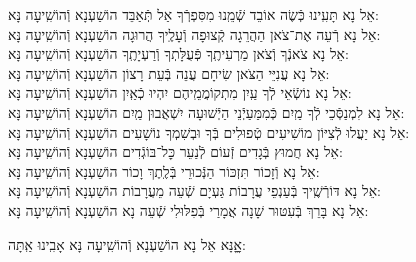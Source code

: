 \documentclass[twoside, openany, parskip=half, 11pt]{book}
\begin{document}
\begin{small}
אֵל נָא תָּעִֽינוּ כְּֿשֶׂה אוֹבֵד שְֿׁמֵֽנוּ מִסִּפְרְֿךָ אַל תְּֿאַבֵּד \hfill הוֹשַׁעְנָא וְֿהוֹשִֽׁיעָה נָּא: \\
אֵל נָא רְֿעֵה אֶת־צֹאן הַהֲרֵגָה קְֿצוּפָה וְֿעָלֶֽיךָ הֲרוּגָה \hfill הוֹשַׁעְנָא וְֿהוֹשִֽׁיעָה נָּא:\\
אֵל נָא צֹאנְֿךָ וְֿצֹאן מַרְעִיתֶֽךָ פְּֿעֻלָּתְךָ וְֿרַעְיָתֶֽךָ \hfill הוֹשַׁעְנָא וְֿהוֹשִֽׁיעָה נָּא:\\
אֵל נָא עֲנִיֵּי הַצֹּאן שִׂיחָם עֲנֵה בְּֿעֵת רָצוֹן \hfill הוֹשַׁעְנָא וְֿהוֹשִֽׁיעָה נָּא:\\
אֵל נָא נוֹשְֿׂאֵי לְֿךָ עַֽיִן מִתְקוֹמֲמֵֽיהֶם יִהְיוּ כְֿאַֽיִן \hfill הוֹשַׁעְנָא וְֿהוֹשִֽׁיעָה נָּא:\\
אֵל נָא לִמְנַסְּֿכֵי לְֿךָ מַֽיִם כְּֿמִמַּעַיְֿנֵי הַיְֿשׁוּעָה יִשְׁאֲבוּן מַֽיִם \hfill הוֹשַׁעְנָא וְֿהוֹשִֽׁיעָה נָּא:\\
אֵל נָא יַעֲלוּ לְֿצִיּוֹן מוֹשִׁיעִים טְֿפוּלִים בְּֿךָ וּבְשִׁמְךָ נוֹשָׁעִים \hfill הוֹשַׁעְנָא וְֿהוֹשִֽׁיעָה נָּא:\\
אֵל נָא חֲמוּץ בְּֿגָדִים זְֿעוֹם לְֿנַעֵר כׇּל־בּוֹגְֿדִים \hfill הוֹשַׁעְנָא וְֿהוֹשִֽׁיעָה נָּא:\\
אֵל נָא וְֿזָכוֹר תִּזְכּוֹר הַנְּֿכוּרֵי בְּֿלֶֽתֶךְ וָכוֹר \hfill הוֹשַׁעְנָא וְֿהוֹשִֽׁיעָה נָּא:\\
אֵל נָא דּוֹרְֿשֶֽׁיךָ בְּֿעַנְפֵי עֲרָבוֹת גַּעְיָם שְֿׁעֵה מֵעֲרָבוֹת \hfill הוֹשַׁעְנָא וְֿהוֹשִֽׁיעָה נָּא:\\
אֵל נָא בָּרֵךְ בְּֿעִטּוּר שָׁנָה אֲמָרַי בְּֿפִלּוּלִי שְֿׁעֵה נָא \hfill הוֹשַׁעְנָא וְֿהוֹשִֽׁיעָה נָּא:

\end{small}

\begin{large}
\shatzvkahal
אׇׇָנָּא אֵל נָא הוֹשַׁעְנָא וְֿהוֹשִֽׁיעָה נָּא אָבִֽינוּ אַֽתָּה:

\end{large}
\end{document}
